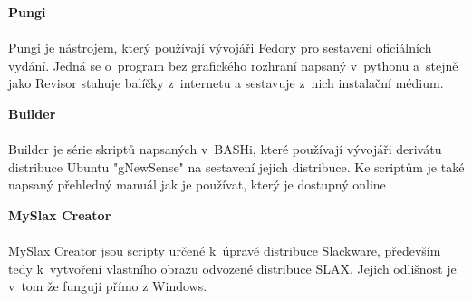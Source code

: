 \documentclass[a4paper,12pt]{article}
\newcommand{\nadpis}[1]{%
	\vspace{4 mm}
	\textbf{#1}\\
	\vspace{4 mm}
	}
\newcommand{\obr}[3]{%
	\begin{figure}[h]
	\center\texttt{[image: \#1]}
	\caption{#3}
	\end{figure}
	}
\begin{document}
\newpage
\nadpis{Pungi}\\
Pungi je nástrojem, který používají vývojáři Fedory pro sestavení oficiálních vydání. Jedná se o~program bez grafického rozhraní napsaný v~pythonu a~stejně jako Revisor stahuje balíčky z~internetu a sestavuje z~nich instalační médium.\cite{Linux_Build}


\nadpis{Builder}\\
Builder je série skriptů napsaných v~BASHi, které používají vývojáři derivátu distribuce Ubuntu "gNewSense" na sestavení jejich distribuce. Ke scriptům je také napsaný přehledný manuál jak je používat, který je dostupný online~\cite{Linux_Build}~\cite{BuilderNavod}.


\nadpis{MySlax Creator}\\
MySlax Creator jsou scripty určené k~úpravě distribuce Slackware, především tedy k~vytvoření vlastního obrazu odvozené distribuce SLAX. Jejich odlišnost je v~tom že fungují přímo z Windows.


\end{document}
